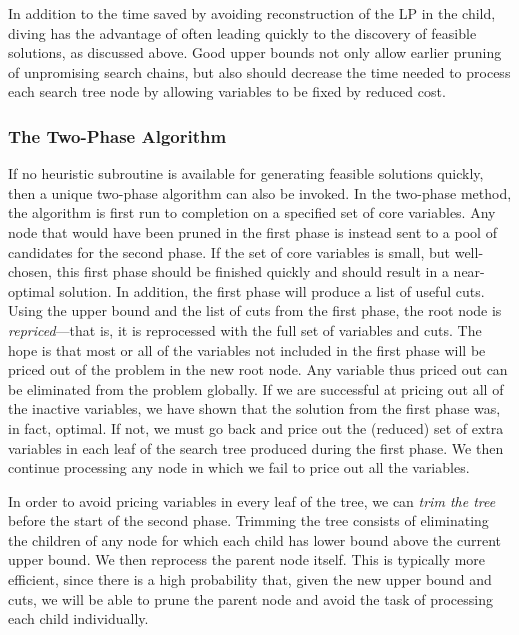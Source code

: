In addition to the time saved by avoiding reconstruction of the LP in
the child, diving has the advantage of often leading quickly to the
discovery of feasible solutions, as discussed above. Good upper bounds
not only allow earlier pruning of unpromising search chains, but also
should decrease the time needed to process each search tree node by
allowing variables to be fixed by reduced cost.

\subsubsection{The Two-Phase Algorithm}
\label{two-phase}

If no heuristic subroutine is available for generating feasible
solutions quickly, then a unique two-phase algorithm can also be
invoked. In the two-phase method, the algorithm is first run to
completion on a specified set of core variables. Any node that would
have been pruned in the first phase is instead sent to a pool of
candidates for the second phase. If the set of core variables is
small, but well-chosen, this first phase should be finished quickly
and should result in a near-optimal solution. In addition, the first
phase will produce a list of useful cuts. Using the upper bound and
the list of cuts from the first phase, the root node is {\em
repriced}---that is, it is reprocessed with the full set of variables
and cuts. The hope is that most or all of the variables not included
in the first phase will be priced out of the problem in the new root
node. Any variable thus priced out can be eliminated from the problem
globally. If we are successful at pricing out all of the inactive
variables, we have shown that the solution from the first phase was,
in fact, optimal. If not, we must go back and price out the (reduced)
set of extra variables in each leaf of the search tree produced during
the first phase. We then continue processing any node in which we fail
to price out all the variables.

In order to avoid pricing variables in every leaf of the tree, we can
{\em trim the tree} before the start of the second phase. Trimming the
tree consists of eliminating the children of any node for which
each child has lower bound above the current upper
bound. We then reprocess the parent node itself. This is typically
more efficient, since there is a high probability that, given the new
upper bound and cuts, we will be able to prune the parent node and
avoid the task of processing each child individually.

